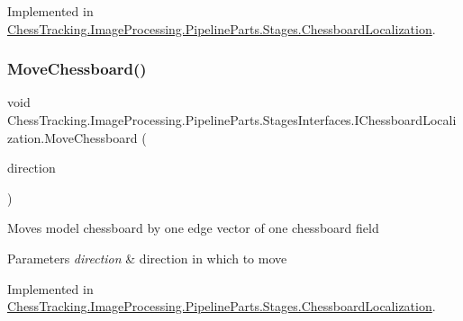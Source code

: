 Implemented in \mbox{\hyperlink{class_chess_tracking_1_1_image_processing_1_1_pipeline_parts_1_1_stages_1_1_chessboard_localization_a488e6669ff26af88dc52e14f7a661e13}{Chess\+Tracking.\+Image\+Processing.\+Pipeline\+Parts.\+Stages.\+Chessboard\+Localization}}.

\mbox{\label{interface_chess_tracking_1_1_image_processing_1_1_pipeline_parts_1_1_stages_interfaces_1_1_i_chessboard_localization_aa9b487eaeca8782b3901f65b1828d951}} 
\subsubsection{\texorpdfstring{MoveChessboard()}{MoveChessboard()}}
{\footnotesize\ttfamily void Chess\+Tracking.\+Image\+Processing.\+Pipeline\+Parts.\+Stages\+Interfaces.\+I\+Chessboard\+Localization.\+Move\+Chessboard (\begin{DoxyParamCaption}\item[{\mbox{\hyperlink{namespace_chess_tracking_1_1_multithreading_messages_1_1_to_processing_af48751428f7a12d314dbbac688726bac}{Chessboard\+Movement}}}]{direction }\end{DoxyParamCaption})}



Moves model chessboard by one edge vector of one chessboard field 


\begin{DoxyParams}{Parameters}
{\em direction} & direction in which to move\\
\hline
\end{DoxyParams}


Implemented in \mbox{\hyperlink{class_chess_tracking_1_1_image_processing_1_1_pipeline_parts_1_1_stages_1_1_chessboard_localization_a3a641c2a7c9880434785b1c7f0a71327}{Chess\+Tracking.\+Image\+Processing.\+Pipeline\+Parts.\+Stages.\+Chessboard\+Localization}}.

\mbox{\label{interface_chess_tracking_1_1_image_processing_1_1_pipeline_parts_1_1_stages_interfaces_1_1_i_chessboard_localization_a198327bd00496b49d385b18622245d38}} 

